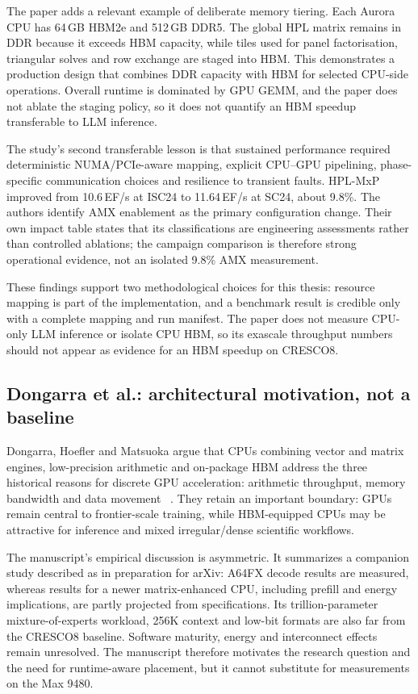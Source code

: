 The paper adds a relevant example of deliberate memory tiering.  Each
Aurora CPU has 64\,GB HBM2e and 512\,GB DDR5.  The global HPL matrix
remains in DDR because it exceeds HBM capacity, while tiles used for
panel factorisation, triangular solves and row exchange are staged into
HBM.  This demonstrates a production design that combines DDR capacity
with HBM for selected CPU-side operations.  Overall runtime is dominated
by GPU GEMM, and the paper does not ablate the staging policy, so it
does not quantify an HBM speedup transferable to LLM inference.

The study's second transferable lesson is that sustained performance
required
deterministic NUMA/PCIe-aware mapping, explicit CPU--GPU pipelining,
phase-specific communication choices and resilience to transient faults.
HPL-MxP improved from 10.6\,EF/s at ISC24 to 11.64\,EF/s at SC24,
about 9.8\%.  The authors identify AMX enablement as the primary
configuration change.  Their own impact table states that its
classifications are engineering assessments rather than controlled
ablations; the campaign comparison is therefore strong operational
evidence, not an isolated 9.8\% AMX measurement.

These findings support two methodological choices for this thesis:
resource mapping is part of the implementation, and a benchmark result
is credible only with a complete mapping and run manifest.  The paper
does not measure CPU-only LLM inference or isolate CPU HBM, so its
exascale throughput numbers should not appear as evidence for an HBM
speedup on CRESCO8.

\subsection{Dongarra et al.: architectural motivation, not a baseline}

Dongarra, Hoefler and Matsuoka argue that CPUs combining vector and
matrix engines, low-precision arithmetic and on-package HBM address the
three historical reasons for discrete GPU acceleration: arithmetic
throughput, memory bandwidth and data movement
~\cite{dongarra2026gpus}.  They retain an important boundary: GPUs
remain central to frontier-scale training, while HBM-equipped CPUs may
be attractive for inference and mixed irregular/dense scientific
workflows.

The manuscript's empirical discussion is asymmetric.  It summarizes a
companion study described as in preparation for arXiv: A64FX decode
results are measured, whereas results for a newer matrix-enhanced CPU,
including prefill and energy implications, are partly projected from
specifications.  Its trillion-parameter mixture-of-experts workload,
256K context and low-bit formats are also far from the CRESCO8 baseline.
Software maturity, energy and interconnect effects remain unresolved.
The manuscript therefore motivates the research question and the need
for runtime-aware placement, but it cannot substitute for measurements
on the Max 9480.

